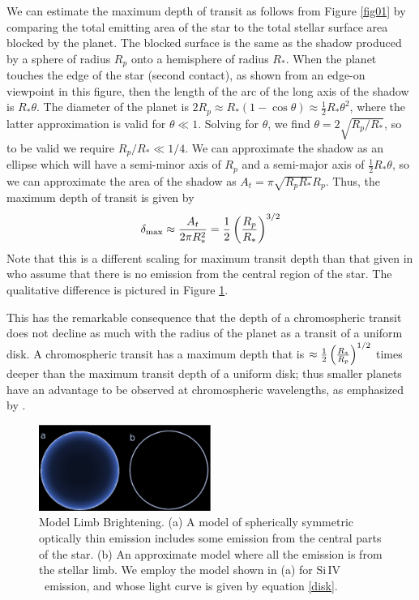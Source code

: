 \documentclass[twocolumn]{emulateapj}
\newcommand{\oi}{\ensuremath{\mathrm{O}\,\scriptstyle \mathrm{I}}}
\newcommand{\siIV}{\ensuremath{\mathrm{Si}\,\scriptstyle \mathrm{IV}}}
\begin{document}
We can estimate the maximum depth of transit as follows from
Figure \ref{fig01} by comparing the total emitting area of the star to the total stellar surface area blocked by the planet. The blocked surface is the same as the shadow produced by a sphere of radius $R_p$ onto a hemisphere of radius $R_*$. When the planet touches the edge of the star 
(second contact), as shown from an edge-on viewpoint in this figure,
then the length of the arc of the long axis of the shadow is
$R_*\theta$.  The diameter of the planet is 
$2 R_p \approx R_*(1-\cos{\theta}) \approx \frac{1}{2} R_* \theta^2$,
where the latter approximation is valid for $\theta \ll 1$.
Solving for $\theta$, we find $\theta = 2\sqrt{R_p/R_*}$, so to
be valid we require $R_p/R_* \ll 1/4$.  We can approximate
the shadow as an ellipse which will have a semi-minor axis of $R_p$
and a semi-major axis of $\frac{1}{2} R_*\theta$, so we can approximate the
area of the shadow as $A_t = \pi \sqrt{R_pR_*} R_p$.  Thus,
the maximum depth of transit is given by 
\begin{equation} \label{depth_anal}
\delta_{\mathrm{max}} \approx {A_t \over 2 \pi R_*^2} = \frac{1}{2} \left({R_p \over R_*}\right)^{3/2}
\end{equation}
Note that this is a different scaling for maximum transit depth than that given in \citet{assef} who assume that there is no emission from the central region of the star. The qualitative difference is pictured in Figure \ref{limbmodel}.


This has the remarkable consequence that the depth of a chromospheric
transit does not decline as much with the radius of the planet as 
a transit of a uniform disk.  A chromospheric transit has a maximum
depth that is $\approx \frac{1}{2} \left({R_* \over R_p}\right)^{1/2}$
times deeper than the maximum transit depth of a uniform disk;
thus smaller planets have an advantage to be observed at
chromospheric wavelengths, as emphasized by \citet{assef}.

\begin{figure}
\begin{center}
\includegraphics[width=0.5\textwidth]{model_comparison.eps}
\caption{Model Limb Brightening. (a) A model of spherically symmetric optically thin emission includes some emission from the central parts of the star. (b) An approximate model where all the emission is from the stellar limb. We employ the model shown in (a) for \siIV\ emission, and whose light curve is given by  equation \ref{disk}.}
\label{limbmodel}
\end{center}
\end{figure}
\end{document}
